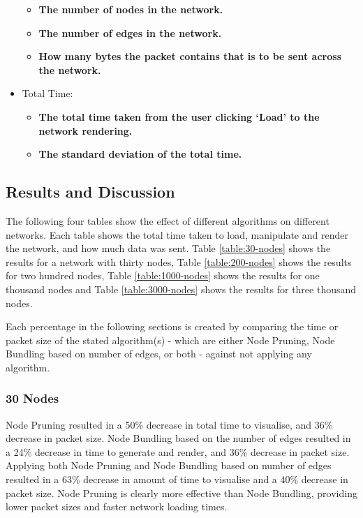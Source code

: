 \documentclass[../dissertation.tex]{subfiles}
\begin{document}
\begin{itemize}
    \begin{itemize}
        \item \textbf{The number of nodes in the network.}
        \item \textbf{The number of edges in the network.}
        \item \textbf{How many bytes the packet contains that is to be sent across the network.}
    \end{itemize}
    \item Total Time:
    \begin{itemize}
        \item \textbf{The total time taken from the user clicking `Load' to the network rendering.}
        \item \textbf{The standard deviation of the total time.}
    \end{itemize}
\end{itemize}

\subsection{Results and Discussion}

The following four tables show the effect of different algorithms on different networks. Each table shows the total time taken to load, manipulate and render the network, and how much data was sent. Table \ref{table:30-nodes} shows the results for a network with thirty nodes, Table \ref{table:200-nodes} shows the results for two hundred nodes, Table \ref{table:1000-nodes} shows the results for one thousand nodes and Table \ref{table:3000-nodes} shows the results for three thousand nodes. 

Each percentage in the following sections is created by comparing the time or packet size of the stated algorithm(s) - which are either Node Pruning, Node Bundling based on number of edges, or both - against not applying any algorithm.

\subsubsection{30 Nodes}

Node Pruning resulted in a 50\% decrease in total time to visualise, and 36\% decrease in packet size. Node Bundling based on the number of edges resulted in a 24\% decrease in time to generate and render, and 36\% decrease in packet size. Applying both Node Pruning and Node Bundling based on number of edges resulted in a 63\% decrease in amount of time to visualise and a 40\% decrease in packet size. Node Pruning is clearly more effective than Node Bundling, providing lower packet sizes and faster network loading times.
\end{document}
